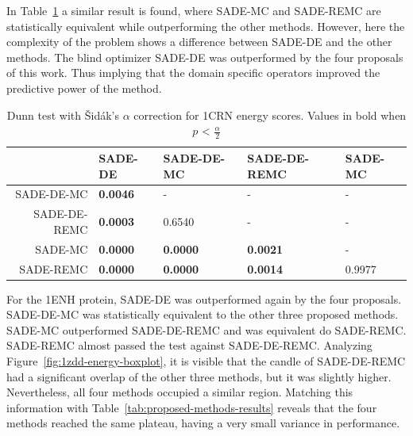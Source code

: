 In Table~\ref{tab:1crn-dunn-energy} a similar result is found, where SADE-MC and SADE-REMC are
statistically equivalent while outperforming the other methods. However, here the complexity
of the problem shows a difference between SADE-DE and the other methods. The blind optimizer
SADE-DE was outperformed by the four proposals of this work. Thus implying that 
the domain specific operators improved the predictive power of the method.


\begin{table}[ht!]
  \centering
  \begin{tabular}{ r | l | l | l | l } \cline{2-5}
              & SADE-DE         & SADE-DE-MC      & SADE-DE-REMC    & SADE-MC     \\ \hline \hline
   SADE-DE-MC & \textbf{0.0046} & -               & -               & -      \\ \hline
 SADE-DE-REMC & \textbf{0.0003} & 0.6540          & -               & -      \\ \hline
      SADE-MC & \textbf{0.0000} & \textbf{0.0000} & \textbf{0.0021} & -      \\ \hline
    SADE-REMC & \textbf{0.0000} & \textbf{0.0000} & \textbf{0.0014} & 0.9977 \\ \hline \hline
  \end{tabular}
  \caption{Dunn test with \v{S}idák's $\alpha$ correction for 1CRN energy scores. Values in bold when $p$ < $\frac{\alpha}{2}$}
  \label{tab:1crn-dunn-energy}
\end{table}

For the 1ENH protein, SADE-DE was outperformed again by the four proposals. SADE-DE-MC was
statistically equivalent to the other three proposed methods. SADE-MC outperformed SADE-DE-REMC
and was equivalent do SADE-REMC. SADE-REMC almost passed the test against SADE-DE-REMC.
Analyzing Figure~\ref{fig:1zdd-energy-boxplot}, it is visible that the candle of
SADE-DE-REMC had a significant overlap of the other three methods, but it was slightly higher.
Nevertheless, all four methods occupied a similar region. Matching this information with
Table~\ref{tab:proposed-methods-results} reveals that the four methods reached the same
plateau, having a very small variance in performance.


